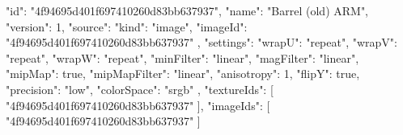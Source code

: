 {
  "id": "4f94695d401f697410260d83bb637937",
  "name": "Barrel (old) ARM",
  "version": 1,
  "source": {
    "kind": "image",
    "imageId": "4f94695d401f697410260d83bb637937"
  },
  "settings": {
    "wrapU": "repeat",
    "wrapV": "repeat",
    "wrapW": "repeat",
    "minFilter": "linear",
    "magFilter": "linear",
    "mipMap": true,
    "mipMapFilter": "linear",
    "anisotropy": 1,
    "flipY": true,
    "precision": "low",
    "colorSpace": "srgb"
  },
  "textureIds": [
    "4f94695d401f697410260d83bb637937"
  ],
  "imageIds": [
    "4f94695d401f697410260d83bb637937"
  ]
}
